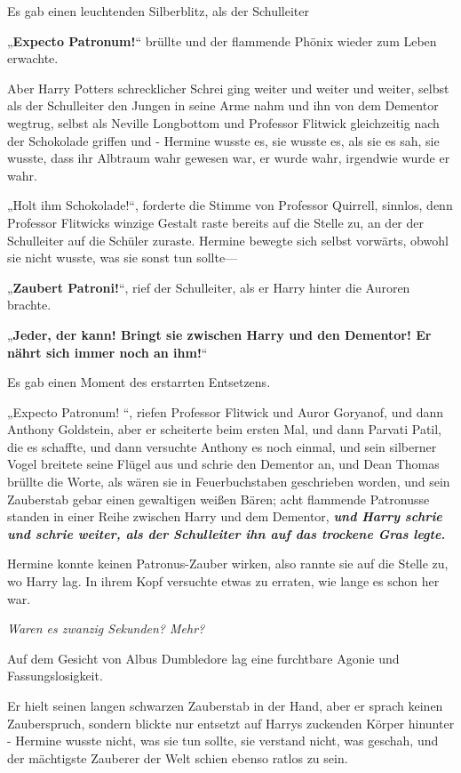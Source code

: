 {Es gab einen leuchtenden Silberblitz, als der Schulleiter

„\textbf{Expecto Patronum!}“ brüllte und der flammende Phönix wieder zum Leben erwachte.

Aber Harry Potters schrecklicher Schrei ging weiter und weiter und weiter, selbst als der Schulleiter den Jungen in seine Arme nahm und ihn von dem Dementor wegtrug, selbst als Neville Longbottom und Professor Flitwick gleichzeitig nach der Schokolade griffen und - Hermine wusste es, sie wusste es, als sie es sah, sie wusste, dass ihr Albtraum wahr gewesen war, er wurde wahr, irgendwie wurde er wahr.

„Holt ihm Schokolade!“, forderte die Stimme von Professor Quirrell, sinnlos, denn Professor Flitwicks winzige Gestalt raste bereits auf die Stelle zu, an der der Schulleiter auf die Schüler zuraste. Hermine bewegte sich selbst vorwärts, obwohl sie nicht wusste, was sie sonst tun sollte—

„\textbf{Zaubert Patroni!}“, rief der Schulleiter, als er Harry hinter die Auroren brachte.

„\textbf{Jeder, der kann! Bringt sie zwischen Harry und den Dementor! Er nährt sich immer noch an ihm!}“

Es gab einen Moment des erstarrten Entsetzens.

„Expecto Patronum! “, riefen Professor Flitwick und Auror Goryanof, und dann Anthony Goldstein, aber er scheiterte beim ersten Mal, und dann Parvati Patil, die es schaffte, und dann versuchte Anthony es noch einmal, und sein silberner Vogel breitete seine Flügel aus und schrie den Dementor an, und Dean Thomas brüllte die Worte, als wären sie in Feuerbuchstaben geschrieben worden, und sein Zauberstab gebar einen gewaltigen weißen Bären; acht flammende Patronusse standen in einer Reihe zwischen Harry und dem Dementor, \textbf{\emph{und Harry schrie und schrie weiter, als der Schulleiter ihn auf das trockene Gras legte.}}

Hermine konnte keinen Patronus-Zauber wirken, also rannte sie auf die Stelle zu, wo Harry lag. In ihrem Kopf versuchte etwas zu erraten, wie lange es schon her war.

\emph{Waren es zwanzig Sekunden? Mehr?}

Auf dem Gesicht von Albus Dumbledore lag eine furchtbare Agonie und Fassungslosigkeit.

Er hielt seinen langen schwarzen Zauberstab in der Hand, aber er sprach keinen Zauberspruch, sondern blickte nur entsetzt auf Harrys zuckenden Körper hinunter - Hermine wusste nicht, was sie tun sollte, sie verstand nicht, was geschah, und der mächtigste Zauberer der Welt schien ebenso ratlos zu sein.

}
